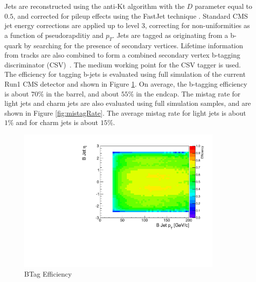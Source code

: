 \documentclass{cmspaper}
\begin{document}
Jets are reconstructed using the anti-Kt algorithm with the $D$ parameter equal to $0.5$,
and corrected for pileup effects using the FastJet technique \cite{CMS:2010xta,CMS-DP-2013-011}. Standard CMS 
jet energy corrections are applied up to level 3, correcting for non-uniformities as a function of
pseudorapditiy and $p_{T}$. Jets are tagged as originating from a b-quark by searching for the
presence of secondary vertices. Lifetime information from tracks are also combined to form a 
combined secondary vertex b-tagging discriminator (CSV)~\cite{CMS:BTagPaper,CMS-DP-2013-005}.
The medium working point for the CSV tagger is used. The efficiency for tagging b-jets is 
evaluated using full simulation of the current Run1 CMS detector and shown in
Figure \ref{fig:btagEfficiency}. On average, the b-tagging efficiency is about $70\%$ in the barrel, and
about $55\%$ in the endcap. The mistag rate for light jets and charm jets are also evaluated using
full simulation samples, and are shown in Figure \ref{fig:mistagRate}. The average mistag rate
for light jets is about $1\%$ and for charm jets is about $15\%$. 

\begin{figure}[h]
  \centering
  \includegraphics[width=0.9\textwidth]{figures/EfficiencyPtEta_BJet.pdf}
  \caption{BTag Efficiency}
  \label{fig:btagEfficiency}
\end{figure}
\end{document}
